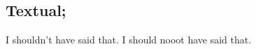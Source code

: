 \newpage
\hypertarget{conBran tex}{}
\subsection{Textual;}
\texHeader

I shouldn't have said that. I should nooot have said that.
